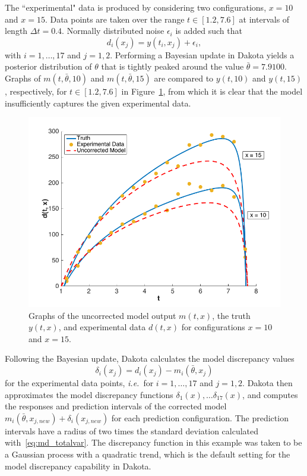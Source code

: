 The ``experimental" data is produced by considering two configurations, $x=10$
and $x=15$. Data points are taken over the range $t \in [1.2, 7.6]$ at 
intervals of length $\Delta t = 0.4$. Normally distributed noise $\epsilon_i$ 
is added such that
\begin{equation}\label{eq:md_data}
d_i(x_j) = y(t_i, x_j) + \epsilon_i,
\end{equation} 
with $i = 1, \ldots, 17$ and $j = 1,2$. Performing a 
Bayesian update in Dakota yields a posterior distribution of $\theta$ that is 
tightly peaked around the value $\bar{\theta} = 7.9100$. Graphs of 
$m(t, \bar{\theta}, 10)$ and $m(t, \bar{\theta}, 15)$ are compared to 
$y(t, 10)$ and $y(t, 15)$, respectively, for $t \in [1.2, 7.6]$ in 
Figure~\ref{fig:md_uncorr}, from which it is clear that the model insufficiently
captures the given experimental data.

\begin{figure}[t]
\begin{center}
\includegraphics[width=.6\textwidth]{images/moddiscrep_TruthExpModel.png}
\end{center}
\vspace{-0.5cm}
\caption{Graphs of the uncorrected model output $m(t,x)$, the truth $y(t,x)$,
and experimental data $d(t,x)$ for configurations $x = 10$ and $x = 15$.}
\label{fig:md_uncorr}
\end{figure}

Following the Bayesian update, Dakota calculates the model discrepancy values
\begin{equation}\label{eq:md_discrep}
\delta_i(x_j) = d_i(x_j) - m_i(\bar{\theta}, x_j)
\end{equation}
for the experimental data points, \textit{i.e.}\ for $i = 1, \ldots, 17$ and
$j = 1,2$. Dakota then approximates the model discrepancy functions 
$\delta_1(x), \ldots \delta_{17}(x)$, and computes the responses and
prediction intervals of the corrected model $m_i(\bar{\theta}, x_{j,new}) 
+ \delta_i(x_{j,new})$ for each prediction configuration. The prediction
intervals have a radius of two times the standard deviation calculated 
with~\ref{eq:md_totalvar}. The discrepancy function in this example was taken
to be a Gaussian process with a quadratic trend, which is the default setting
for the model discrepancy capability in Dakota.


